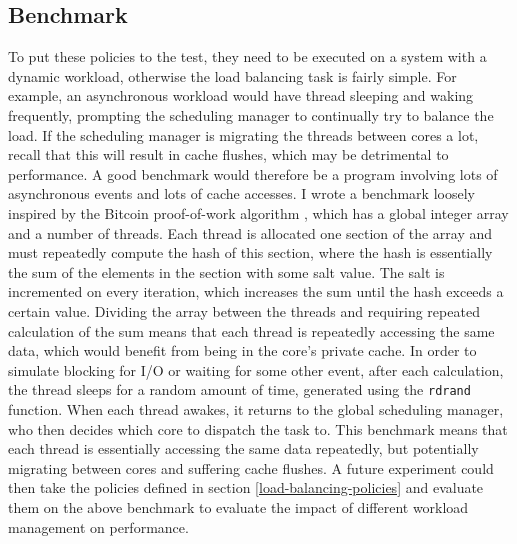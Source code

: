 \documentclass[bsc,frontabs,singlespacing,parskip,deptreport]{infthesis}
\begin{document}
\subsection{Benchmark}
To put these policies to the test, they need to be executed on a system with a dynamic workload, otherwise the load balancing task is fairly simple. For example, an asynchronous workload would have thread sleeping and waking frequently, prompting the scheduling manager to continually try to balance the load. If the scheduling manager is migrating the threads between cores a lot, recall that this will result in cache flushes, which may be detrimental to performance. A good benchmark would therefore be a program involving lots of asynchronous events and lots of cache accesses. I wrote a benchmark loosely inspired by the Bitcoin proof-of-work algorithm \cite{proof-of-work}, which has a global integer array and a number of threads. Each thread is allocated one section of the array and must repeatedly compute the hash of this section, where the hash is essentially the sum of the elements in the section with some salt value. The salt is incremented on every iteration, which increases the sum until the hash exceeds a certain value. Dividing the array between the threads and requiring repeated calculation of the sum means that each thread is repeatedly accessing the same data, which would benefit from being in the core's private cache. In order to simulate blocking for I/O or waiting for some other event, after each calculation, the thread sleeps for a random amount of time, generated using the \verb|rdrand| function. When each thread awakes, it returns to the global scheduling manager, who then decides which core to dispatch the task to. This benchmark means that each thread is essentially accessing the same data repeatedly, but potentially migrating between cores and suffering cache flushes. A future experiment could then take the policies defined in section \ref{load-balancing-policies} and evaluate them on the above benchmark to evaluate the impact of different workload management on performance.



\end{document}
